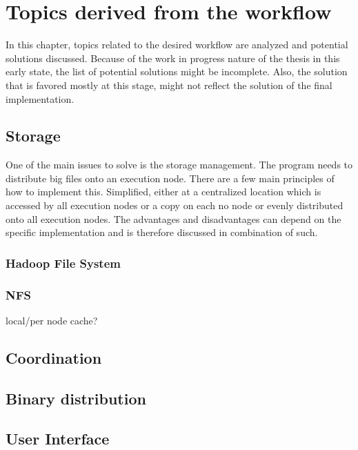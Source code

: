 \chapter{Topics derived from the workflow}

In this chapter, topics related to the desired workflow are analyzed and potential solutions discussed.
Because of the work in progress nature of the thesis in this early state, the list of potential solutions might be incomplete.
Also, the solution that is favored mostly at this stage, might not reflect the solution of the final implementation.

\section{Storage}

One of the main issues to solve is the storage management.
The program needs to distribute big files onto an execution node.
There are a few main principles of how to implement this.
Simplified, either at a centralized location which is accessed by all execution nodes or a copy on each no node or evenly distributed onto all execution nodes.
The advantages and disadvantages can depend on the specific implementation and is therefore discussed in combination of such.

\subsection{Hadoop File System}

\cite{hdfs:main}
\cite{hdfs:doc}

\subsection{NFS}

local/per node cache?

\section{Coordination}

\section{Binary distribution}

\section{User Interface}




